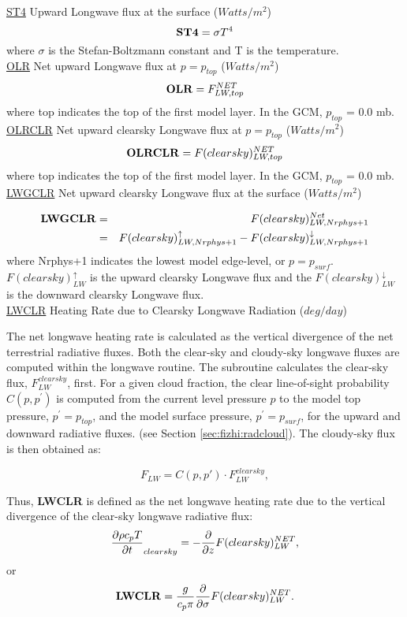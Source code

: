  
\noindent
{ \underline {ST4} Upward Longwave flux at the surface ($Watts/m^2$) }
\[
{\bf ST4} = \sigma T^4
\]
\noindent
where $\sigma$ is the Stefan-Boltzmann constant and T is the temperature.
\\
 
\noindent
{ \underline {OLR} Net upward Longwave flux at $p=p_{top}$ ($Watts/m^2$) }
\[
{\bf OLR}  =  F_{LW,top}^{NET}
\]
\noindent
where top indicates the top of the first model layer.
In the GCM, $p_{top}$ = 0.0 mb.
\\


\noindent
{ \underline {OLRCLR} Net upward clearsky Longwave flux at $p=p_{top}$ ($Watts/m^2$) }
\[
{\bf OLRCLR}  =  F(clearsky)_{LW,top}^{NET}
\]
\noindent
where top indicates the top of the first model layer.
In the GCM, $p_{top}$ = 0.0 mb.
\\

\noindent
{ \underline {LWGCLR} Net upward clearsky Longwave flux at the surface ($Watts/m^2$) }

\noindent
\begin{eqnarray*}
{\bf LWGCLR} & =  & F(clearsky)_{LW,Nrphys+1}^{Net} \\
             & =  & F(clearsky)_{LW,Nrphys+1}^\uparrow - F(clearsky)_{LW,Nrphys+1}^\downarrow
\end{eqnarray*}
where Nrphys+1 indicates the lowest model edge-level, or $p = p_{surf}$.
$F(clearsky)_{LW}^\uparrow$ is
the upward clearsky Longwave flux and the $F(clearsky)_{LW}^\downarrow$ is the downward clearsky Longwave flux.
\\

\noindent
{ \underline {LWCLR} Heating Rate due to Clearsky Longwave Radiation ($deg/day$) }

\noindent
The net longwave heating rate is calculated as the vertical divergence of the
net terrestrial radiative fluxes.
Both the clear-sky and cloudy-sky longwave fluxes are computed within the
longwave routine.
The subroutine calculates the clear-sky flux, $F^{clearsky}_{LW}$, first.
For a given cloud fraction,
the clear line-of-sight probability $C(p,p^{\prime})$ is computed from the current level pressure $p$ 
to the model top pressure, $p^{\prime} = p_{top}$, and the model surface pressure, $p^{\prime} = p_{surf}$,
for the upward and downward radiative fluxes.
(see Section \ref{sec:fizhi:radcloud}).
The cloudy-sky flux is then obtained as:
   
\noindent
\[
F_{LW} = C(p,p') \cdot F^{clearsky}_{LW},
\]

\noindent
Thus, {\bf LWCLR} is defined as the net longwave heating rate due to the 
vertical divergence of the
clear-sky longwave radiative flux:
\[
\frac{\partial \rho c_p T}{\partial t}_{clearsky} = - \frac{\partial }{\partial z} F(clearsky)_{LW}^{NET} ,
\]
or
\[
{\bf LWCLR} = \frac{g}{c_p \pi} \frac{\partial }{\partial \sigma} F(clearsky)_{LW}^{NET} .
\]

